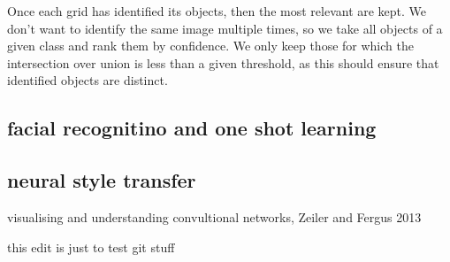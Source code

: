 \documentclass{article}
\begin{document}
Once each grid has identified its objects, then the most relevant are kept. We don't want to identify the same image multiple times, so we take all objects of a given class and rank them by confidence. We only keep those for which the intersection over union is less than a given threshold, as this should ensure that identified objects are distinct.

\subsection{facial recognitino and one shot learning}


\subsection{neural style transfer}
visualising and understanding convultional networks, Zeiler and Fergus 2013


this edit is just to test git stuff
\end{document}
